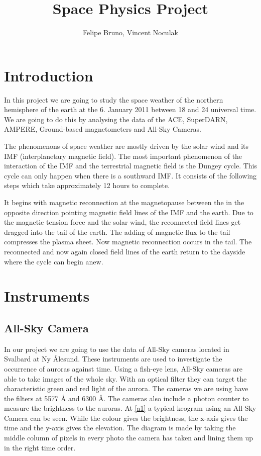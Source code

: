 \documentclass[10pt,a4paper]{article}
\author{Felipe Bruno, Vincent Noculak}
\title{Space Physics Project}
\begin{document}
\maketitle
\newpage
\tableofcontents
\newpage


\section{Introduction}

In this project we are going to study the space weather of the northern hemisphere of the earth at the 6. January 2011 between 18 and 24 universal time. We are going to do this by analysing the data of the ACE, SuperDARN, AMPERE, Ground-based magnetometers and All-Sky Cameras.

The phenomenons of space weather are mostly driven by the solar wind and its IMF (interplanetary magnetic field). The most important phenomenon of the interaction of the IMF and the terrestrial magnetic field is the Dungey cycle. This cycle can only happen when there is a southward IMF. It consists of the following steps which take approximately 12 hours to complete.

It begins with magnetic reconnection at the magnetopause between the in the opposite direction pointing magnetic field lines of the IMF and the earth. Due to the magnetic tension force and the solar wind, the reconnected field lines get dragged into the tail of the earth. The adding of magnetic flux to the tail compresses the plasma sheet. Now magnetic reconnection occurs in the tail. The reconnected and now again closed field lines of the earth return to the dayside where the cycle can begin anew.

\section{Instruments}

\subsection{All-Sky Camera}

In our project we are going to use the data of All-Sky cameras located in Svalbard at Ny Ålesund. These instruments are used to investigate the occurrence of auroras against time.
 Using a fish-eye lens, All-Sky cameras are able to take images of the whole sky. With an optical filter they can target the characteristic green and red light of the aurora. The cameras we are using have the filters at 5577 Å and 6300 Å. The cameras also include a photon counter to measure the brightness to the auroras. At \ref{a1} a typical keogram using an All-Sky Camera can be seen. While the colour gives the brightness, the x-axis gives the time and the y-axis gives the elevation. The diagram is made by taking the middle column of pixels in every photo the camera has taken and lining them up in the right time order.
\end{document}
